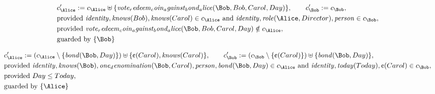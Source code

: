 \begin{align*}
&
c'_
{
\Alice
}
 := 
c_
{
\Alice
}
 \uplus 
\{
\mathit{
vote_redeem_coin_against_bond_alice
}
(
\Bob
,
Bob
,
Carol
,
Day
)
\}
, \qquad 
c'_
{
\Bob
}
 := 
c_
{
\Bob
}
,\\
&
\text{provided } 
\mathit{
identity
}
,
\mathit{
knows
}
(
Bob
)
,
\mathit{
knows
}
(
Carol
)
 \in c_
{
\Alice
}
 \text{ and } 
\mathit{
identity
}
,
\mathit{
role
}
(
\Alice
,
Director
)
,
\mathit{
person
}
 \in c_
{
\Bob
}
,\\
&
\text{provided } 
\mathit{
vote_redeem_coin_against_bond_alice
}
(
\Bob
,
Bob
,
Carol
,
Day
)
 \notin c_
{
\Alice
}
,\\
&
\text{guarded by } \{
\Bob
\}
\end{align*}

\begin{align*}
&
c'_
{
\Alice
}
 := 
(c_
{
\Alice
}
 \setminus 
\{
\mathit{
bond
}
(
\Bob
,
Day
)
\}
) \uplus 
\{
\text{\textcent}
(
Carol
)
,
\mathit{
knows
}
(
Carol
)
\}
, \qquad 
c'_
{
\Bob
}
 := 
(c_
{
\Bob
}
 \setminus 
\{
\text{\textcent}
(
Carol
)
\}
) \uplus 
\{
\mathit{
bond
}
(
\Bob
,
Day
)
\}
,\\
&
\text{provided } 
\mathit{
identity
}
,
\mathit{
knows
}
(
\Bob
)
,
\mathit{
one_denomination
}
(
\Bob
,
Carol
)
,
\mathit{
person
}
,
\mathit{
bond
}
(
\Bob
,
Day
)
 \in c_
{
\Alice
}
 \text{ and } 
\mathit{
identity
}
,
\mathit{
today
}
(
Today
)
,
\text{\textcent}
(
Carol
)
 \in c_
{
\Bob
}
,\\
&
\text{provided } 
Day
\le
Today
,\\
&
\text{guarded by } \{
\Alice
\}
\end{align*}

